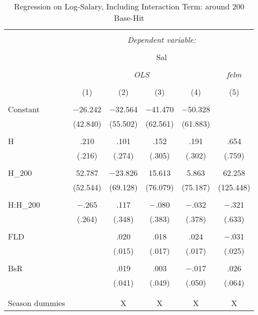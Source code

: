 
\begin{table}[H] \centering
  \caption{Regression on Log-Salary, Including Interaction Term:
          around 200 Base-Hit}
  \label{H200_A}
\tiny
\begin{tabular}{@{\extracolsep{5pt}}lccccc}
\\[-1.8ex]\hline
\hline \\[-1.8ex]
 & \multicolumn{5}{c}{\textit{Dependent variable:}} \\
\cline{2-6}
\\[-1.8ex] & \multicolumn{5}{c}{Sal} \\
\\[-1.8ex] & \multicolumn{4}{c}{\textit{OLS}} & \textit{felm} \\
\\[-1.8ex] & (1) & (2) & (3) & (4) & (5)\\
\hline \\[-1.8ex]
 Constant & $-$26.242 & $-$32.564 & $-$41.470 & $-$50.328 &  \\
  & (42.840) & (55.502) & (62.561) & (61.883) &  \\
  & & & & & \\
 H & .210 & .101 & .152 & .191 & .654 \\
  & (.216) & (.274) & (.305) & (.302) & (.759) \\
  & & & & & \\
 H\_200 & 52.787 & $-$23.826 & 15.613 & 5.863 & 62.258 \\
  & (52.544) & (69.128) & (76.079) & (75.187) & (125.448) \\
  & & & & & \\
  H:H\_200 & $-$.265 & .117 & $-$.080 & $-$.032 & $-$.321 \\
  & (.264) & (.348) & (.383) & (.378) & (.633) \\
  & & & & & \\
 FLD &  & .020 & .018 & .024 & $-$.031 \\
  &  & (.015) & (.017) & (.017) & (.025) \\
  & & & & & \\
 BsR &  & .019 & .003 & $-$.017 & .026 \\
  &  & (.041) & (.049) & (.050) & (.064) \\
  & & & & & \\
\hline \\[-1.8ex]
Season dummies &  & X & X & X & X \\

\end{tabular}
\end{table}
